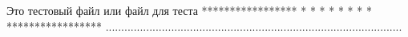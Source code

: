 Это тестовый файл
или файл для теста
*****************
*     *      *  *
*  *     *      *
*****************
...............................................................................................